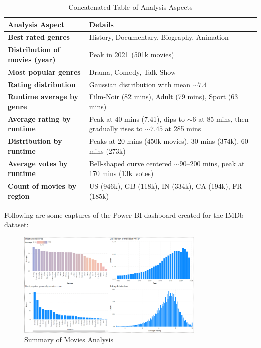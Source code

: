\documentclass[a4paper,12pt]{article}
\begin{document}
\begin{table}[ht]
    \centering
    \begin{tabular}{|l|p{10cm}|}
    \hline
    \textbf{Analysis Aspect} & \textbf{Details} \\
    \hline
    \textbf{Best rated genres} & History, Documentary, Biography, Animation \\
    \hline
    \textbf{Distribution of movies (year)} & Peak in 2021 (501k movies) \\
    \hline
    \textbf{Most popular genres} & Drama, Comedy, Talk-Show \\
    \hline
    \textbf{Rating distribution} & Gaussian distribution with mean \(\sim 7.4\) \\
    \hline
    \textbf{Runtime average by genre} & Film-Noir (82 mins), Adult (79 mins), Sport (63 mins) \\
    \hline
    \textbf{Average rating by runtime} & Peak at 40 mins (7.41), dips to \(\sim 6\) at 85 mins, then gradually rises to \(\sim 7.45\) at 285 mins \\
    \hline
    \textbf{Distribution by runtime} & Peaks at 20 mins (450k movies), 30 mins (374k), 60 mins (273k) \\
    \hline
    \textbf{Average votes by runtime} & Bell-shaped curve centered \(\sim 90\)–200 mins, peak at 170 mins (13k votes) \\
    \hline
    \textbf{Count of movies by region} & US (946k), GB (118k), IN (334k), CA (194k), FR (185k) \\
    \hline
    \end{tabular}
    \caption{Concatenated Table of Analysis Aspects}
    \label{tab:analysis_aspects}
\end{table}
    
Following are some captures of the Power BI dashboard created for the IMDb dataset:

\begin{figure}[H]
    \centering
    \includegraphics[width=0.8\textwidth]{../assets/movies_summary.png}
    \caption{Summary of Movies Analysis}
    \label{fig:movies_summary}
\end{figure}
\end{document}
